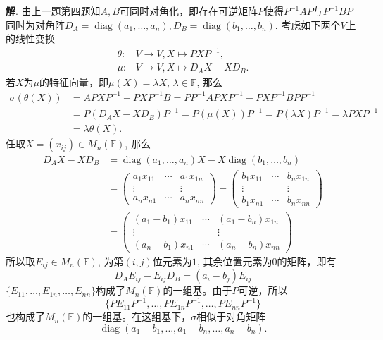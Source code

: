 {\bf 解}. 由上一题第四题知$A,B$可同时对角化，即存在可逆矩阵$P$使得$P^{-1}AP$与$P^{-1}BP$同时为对角阵$D_A = \operatorname{diag}(a_1, \ldots, a_n), D_B = \operatorname{diag}(b_1, \ldots, b_n)$. 考虑如下两个$V$上的线性变换
\begin{align*}
\theta: & V \to V, X \mapsto PXP^{-1},\\
\mu: & V \to V, X \mapsto D_A X - X D_B.
\end{align*}
若$X$为$\mu$的特征向量，即$\mu(X) = \lambda X$, $\lambda \in \mathbb{F}$, 那么
\begin{align*}
\sigma(\theta(X)) & = A PXP^{-1} - PXP^{-1} B = PP^{-1}APXP^{-1} - PXP^{-1}BPP^{-1} \\
& = P(D_AX - XD_B)P^{-1} = P(\mu(X))P^{-1} = P (\lambda X) P^{-1} = \lambda PXP^{-1} \\
& = \lambda \theta(X).
\end{align*}
任取$X = (x_{ij}) \in M_n (\mathbb{F})$, 那么
\begin{align*}
D_AX - XD_B & = \operatorname{diag}(a_1, \ldots, a_n) X - X \operatorname{diag}(b_1, \ldots, b_n) \\
& = \begin{pmatrix} a_1x_{11} & \cdots & a_1x_{1n} \\ \vdots & & \vdots \\ a_nx_{n1} & \cdots & a_nx_{nn} \end{pmatrix} - \begin{pmatrix} b_1x_{11} & \cdots & b_nx_{1n} \\ \vdots & & \vdots \\ b_1x_{n1} & \cdots & b_nx_{nn} \end{pmatrix} \\
& = \begin{pmatrix} (a_1-b_1)x_{11} & \cdots & (a_1-b_n)x_{1n} \\ \vdots & & \vdots \\ (a_n-b_1)x_{n1} & \cdots & (a_n-b_n)x_{nn} \end{pmatrix}
\end{align*}
所以取$E_{ij} \in M_n (\mathbb{F})$, 为第$(i,j)$位元素为$1$, 其余位置元素为$0$的矩阵，即有
$$D_AE_{ij} - E_{ij}D_B = (a_i-b_j)E_{ij}$$
$\{ E_{11}, \ldots, E_{1n}, \ldots, E_{nn}\}$构成了$M_n (\mathbb{F}) $的一组基。由于$P$可逆，所以
$$\{ PE_{11}P^{-1}, \ldots, PE_{1n}P^{-1}, \ldots, PE_{nn}P^{-1} \}$$
也构成了$M_n (\mathbb{F})$的一组基。在这组基下，$\sigma$相似于对角矩阵
$$\operatorname{diag}(a_1-b_1, \ldots, a_1-b_n, \ldots, a_n-b_n).$$


\newpageorvspace


